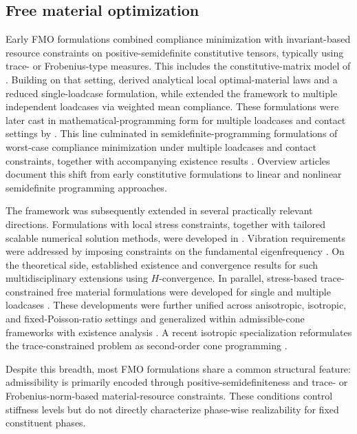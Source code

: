 \documentclass[preprint,3p]{elsarticle}
\begin{document}
\subsection{Free material optimization}\label{sec:intro_fmo}
Early FMO formulations combined compliance minimization with invariant-based resource constraints on positive-semidefinite constitutive tensors, typically using trace- or Frobenius-type measures. This includes the constitutive-matrix model of \citet{Ringertz1993}. Building on that setting, \citet{Bendsoe1994} derived analytical local optimal-material laws and a reduced single-loadcase formulation, while \citet{Bendsoe1995} extended the framework to multiple independent loadcases via weighted mean compliance. These formulations were later cast in mathematical-programming form for multiple loadcases and contact settings by \citet{Zowe1997}. This line culminated in semidefinite-programming formulations of worst-case compliance minimization under multiple loadcases and contact constraints, together with accompanying existence results \citep{BenTal2000}. Overview articles \citep{Kocvara2002,Kocvara2008} document this shift from early constitutive formulations to linear and nonlinear semidefinite programming approaches.

The framework was subsequently extended in several practically relevant directions. Formulations with local stress constraints, together with tailored scalable numerical solution methods, were developed in \citep{Kocvara2007,Kocvara2012}. Vibration requirements were addressed by imposing constraints on the fundamental eigenfrequency \citep{Stingl2009}. On the theoretical side, \citet{Haslinger2010} established existence and convergence results for such multidisciplinary extensions using $H$-convergence. In parallel, stress-based trace-constrained free material formulations were developed for single and multiple loadcases \citep{Czarnecki2012,Czarnecki2014}. These developments were further unified across anisotropic, isotropic, and fixed-Poisson-ratio settings \citep{Lewinski2021} and generalized within admissible-cone frameworks with existence analysis \citep{Bobotowski2022}. A recent isotropic specialization reformulates the trace-constrained problem as second-order cone programming \citep{Yang2019}.

Despite this breadth, most FMO formulations share a common structural feature: admissibility is primarily encoded through positive-semidefiniteness and trace- or Frobenius-norm-based material-resource constraints. These conditions control stiffness levels but do not directly characterize phase-wise realizability for fixed constituent phases.
\end{document}
